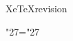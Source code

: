 
\begingroup

\expandafter\ifx\csname XeTeXrevision\endcsname\relax
\else

  \lccode"27="27 %

  \let\BEGINGROUP=\begingroup
  \def\begingroup{%
    \XeTeXinputencoding "bytes" %
    \BEGINGROUP
  }

  \let\PATTERNS=\patterns
  \def\patterns{%
    \endgroup %
    \BEGINGROUP %
    \PATTERNS %
  }

\fi



\endgroup
\endinput
